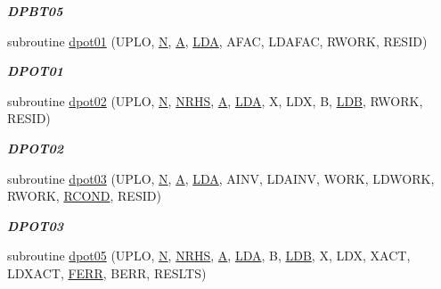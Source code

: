\begin{DoxyCompactItemize}
\begin{DoxyCompactList}\small\item\em {\bfseries D\+P\+B\+T05} \end{DoxyCompactList}\item 
subroutine \hyperlink{group__double__lin_ga532bca0b6f51d56971e9e5a8c9e64416}{dpot01} (U\+P\+L\+O, \hyperlink{polmisc_8c_a0240ac851181b84ac374872dc5434ee4}{N}, \hyperlink{classA}{A}, \hyperlink{example__user_8c_ae946da542ce0db94dced19b2ecefd1aa}{L\+D\+A}, A\+F\+A\+C, L\+D\+A\+F\+A\+C, R\+W\+O\+R\+K, R\+E\+S\+I\+D)
\begin{DoxyCompactList}\small\item\em {\bfseries D\+P\+O\+T01} \end{DoxyCompactList}\item 
subroutine \hyperlink{group__double__lin_ga65eec50f9e0bb081e35c0e1aae270fdb}{dpot02} (U\+P\+L\+O, \hyperlink{polmisc_8c_a0240ac851181b84ac374872dc5434ee4}{N}, \hyperlink{example__user_8c_aa0138da002ce2a90360df2f521eb3198}{N\+R\+H\+S}, \hyperlink{classA}{A}, \hyperlink{example__user_8c_ae946da542ce0db94dced19b2ecefd1aa}{L\+D\+A}, X, L\+D\+X, B, \hyperlink{example__user_8c_a50e90a7104df172b5a89a06c47fcca04}{L\+D\+B}, R\+W\+O\+R\+K, R\+E\+S\+I\+D)
\begin{DoxyCompactList}\small\item\em {\bfseries D\+P\+O\+T02} \end{DoxyCompactList}\item 
subroutine \hyperlink{group__double__lin_gab69f4da22b599df01d0b6fb5d3144c98}{dpot03} (U\+P\+L\+O, \hyperlink{polmisc_8c_a0240ac851181b84ac374872dc5434ee4}{N}, \hyperlink{classA}{A}, \hyperlink{example__user_8c_ae946da542ce0db94dced19b2ecefd1aa}{L\+D\+A}, A\+I\+N\+V, L\+D\+A\+I\+N\+V, W\+O\+R\+K, L\+D\+W\+O\+R\+K, R\+W\+O\+R\+K, \hyperlink{superlu__enum__consts_8h_af00a42ecad444bbda75cde1b64bd7e72a9b5c151728d8512307565994c89919d5}{R\+C\+O\+N\+D}, R\+E\+S\+I\+D)
\begin{DoxyCompactList}\small\item\em {\bfseries D\+P\+O\+T03} \end{DoxyCompactList}\item 
subroutine \hyperlink{group__double__lin_gae485e6ded732a7296ba1291c3ca4cd43}{dpot05} (U\+P\+L\+O, \hyperlink{polmisc_8c_a0240ac851181b84ac374872dc5434ee4}{N}, \hyperlink{example__user_8c_aa0138da002ce2a90360df2f521eb3198}{N\+R\+H\+S}, \hyperlink{classA}{A}, \hyperlink{example__user_8c_ae946da542ce0db94dced19b2ecefd1aa}{L\+D\+A}, B, \hyperlink{example__user_8c_a50e90a7104df172b5a89a06c47fcca04}{L\+D\+B}, X, L\+D\+X, X\+A\+C\+T, L\+D\+X\+A\+C\+T, \hyperlink{superlu__enum__consts_8h_af00a42ecad444bbda75cde1b64bd7e72a78fd14d7abebae04095cfbe02928f153}{F\+E\+R\+R}, B\+E\+R\+R, R\+E\+S\+L\+T\+S)

\end{DoxyCompactItemize}
